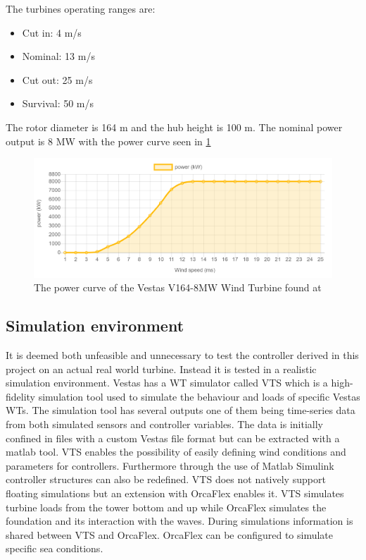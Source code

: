 The turbines operating ranges are:
\begin{itemize}
	\item Cut in: 4 m/s
	\item Nominal: 13 m/s
	\item Cut out: 25 m/s
	\item Survival: 50 m/s
\end{itemize}
The rotor diameter is 164 m and the hub height is 100 m. The nominal power output is 8 MW with the power curve seen in \cref{fig:v164_8mw_pc}
\begin{figure}[ht]
	\centering
	\includegraphics[width=0.95\linewidth]{Graphics/v164-8mw_powerCurve.PNG}
	\caption{The power curve of the Vestas V164-8MW Wind Turbine found at \cite{LucasBauer}}
	\label{fig:v164_8mw_pc}
\end{figure}

\subsection{Simulation environment}
It is deemed both unfeasible and unnecessary to test the controller derived in this project on an actual real world turbine. Instead it is tested in a realistic simulation environment. Vestas has a WT simulator called VTS which is a high-fidelity simulation tool used to simulate the behaviour and loads of specific Vestas WTs. The simulation tool has several outputs one of them being time-series data from both simulated sensors and controller variables. The data is initially confined in files with a custom Vestas file format but can be extracted with a matlab tool. VTS enables the possibility of easily defining wind conditions and parameters for controllers. Furthermore through the use of Matlab Simulink controller structures can also be redefined. VTS does not natively support floating simulations but an extension with OrcaFlex enables it. VTS simulates turbine loads from the tower bottom and up while OrcaFlex simulates the foundation and its interaction with the waves. During simulations information is shared between VTS and OrcaFlex. OrcaFlex can be configured to simulate specific sea conditions.

